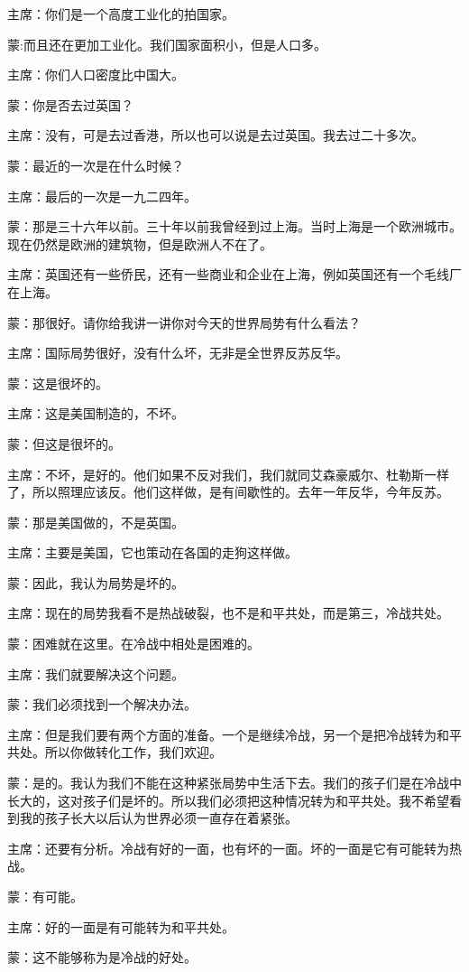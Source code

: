 主席：你们是一个高度工业化的拍国家。

蒙:而且还在更加工业化。我们国家面积小，但是人口多。

主席：你们人口密度比中国大。

蒙：你是否去过英国？

主席：没有，可是去过香港，所以也可以说是去过英国。我去过二十多次。

蒙：最近的一次是在什么时候？

主席：最后的一次是一九二四年。

蒙：那是三十六年以前。三十年以前我曾经到过上海。当时上海是一个欧洲城市。现在仍然是欧洲的建筑物，但是欧洲人不在了。

主席：英国还有一些侨民，还有一些商业和企业在上海，例如英国还有一个毛线厂在上海。

蒙：那很好。请你给我讲一讲你对今天的世界局势有什么看法？

主席：国际局势很好，没有什么坏，无非是全世界反苏反华。

蒙：这是很坏的。

主席：这是美国制造的，不坏。

蒙：但这是很坏的。

主席：不坏，是好的。他们如果不反对我们，我们就同艾森豪威尔、杜勒斯一样了，所以照理应该反。他们这样做，是有间歇性的。去年一年反华，今年反苏。

蒙：那是美国做的，不是英国。

主席：主要是美国，它也策动在各国的走狗这样做。

蒙：因此，我认为局势是坏的。

主席：现在的局势我看不是热战破裂，也不是和平共处，而是第三，冷战共处。

蒙：困难就在这里。在冷战中相处是困难的。

主席：我们就要解决这个问题。

蒙：我们必须找到一个解决办法。

主席：但是我们要有两个方面的准备。一个是继续冷战，另一个是把冷战转为和平共处。所以你做转化工作，我们欢迎。

蒙：是的。我认为我们不能在这种紧张局势中生活下去。我们的孩子们是在冷战中长大的，这对孩子们是坏的。所以我们必须把这种情况转为和平共处。我不希望看到我的孩子长大以后认为世界必须一直存在着紧张。

主席：还要有分析。冷战有好的一面，也有坏的一面。坏的一面是它有可能转为热战。

蒙：有可能。

主席：好的一面是有可能转为和平共处。

蒙：这不能够称为是冷战的好处。

